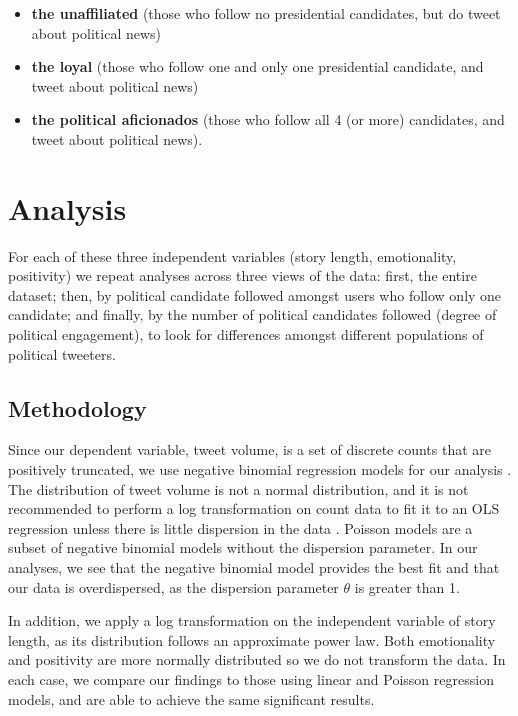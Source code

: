 \documentclass[letterpaper]{article}
\begin{document}
\begin{itemize}
  \item \textbf{the unaffiliated} (those who follow no presidential candidates, but do tweet about political news)
  \item \textbf{the loyal} (those who follow one and only one presidential candidate, and tweet about political news)
  \item \textbf{the political aficionados} (those who follow all 4 (or more) candidates, and tweet about political news).
\end{itemize}


\section{Analysis} 
For each of these three independent variables (story length, emotionality, positivity) we repeat analyses across three views of the data: first, the entire dataset; then, by political candidate followed amongst users who follow only one candidate; and finally, by the number of political candidates followed (degree of political engagement), to look for differences amongst different populations of political tweeters.


\subsection{Methodology}

Since our dependent variable, tweet volume, is a set of discrete counts that are positively truncated, we use negative binomial regression models for our analysis \cite{scott1997regression}. The distribution of tweet volume is not a normal distribution, and it is not recommended to perform a log transformation on count data to fit it to an OLS regression unless there is little dispersion in the data \cite{o2010not}. Poisson models are a subset of negative binomial models without the dispersion parameter. In our analyses, we see that the negative binomial model provides the best fit and that our data is overdispersed, as the dispersion parameter $\theta$ is greater than 1.   

In addition, we apply a log transformation on the independent variable of story length, as its distribution follows an approximate power law. Both emotionality and positivity are more normally distributed so we do not transform the data.
In each case, we compare our findings to those using linear and Poisson regression models, and are able to achieve the same significant results. 
\end{document}
